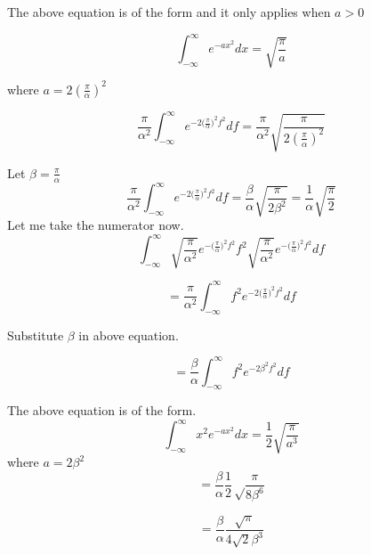 \documentclass[paper=a4, fontsize=11pt,twoside]{scrartcl}		%
\begin{document}
The above equation is of the form and it only applies when $a > 0$

\begin{equation*}
\int_{-\infty}^{\infty}e^{-ax^2 }dx = \sqrt{\frac{\pi}{a}}
\end{equation*}

where $a = 2(\frac{\pi}{\alpha})^ 2$

\begin{equation*}
\frac{\pi}{\alpha ^2} \int_{-\infty}^{\infty}{ e^{-2{(\frac{\pi} {\alpha}})^2 f^2}df} = \frac{\pi}{\alpha ^2} \sqrt{\frac{\pi}{2(\frac{\pi}{\alpha})^ 2}}
\end{equation*}

Let $\beta = \frac{\pi}{\alpha}$
\begin{equation*}
\frac{\pi}{\alpha ^2} \int_{-\infty}^{\infty}{ e^{-2{(\frac{\pi} {\alpha}})^2 f^2}df} = \frac{\beta}{\alpha} \sqrt{\frac{\pi}{2 \beta^ 2}} = \frac{1}{\alpha} \sqrt{\frac{\pi}{2 }}
\end{equation*}
Let me take the numerator now.
\begin{equation*}
\int_{-\infty}^{\infty}{\sqrt{\frac{\pi}{\alpha ^2}} e^{-{(\frac{\pi} {\alpha}})^2 f^2} f^2  \sqrt{\frac{\pi}{\alpha ^2}} e^{-{(\frac{\pi} {\alpha}})^2 f^2} df}
\end{equation*}

\begin{equation*}
=\frac{\pi}{\alpha ^2}\int_{-\infty}^{\infty}{ f^2 e^{-2{(\frac{\pi} {\alpha}})^2 f^2}  df}
\end{equation*}

Substitute $\beta$ in above equation.

\begin{equation*}
=\frac{\beta}{\alpha }\int_{-\infty}^{\infty}{ f^2 e^{-2 \beta ^2 f^2}  df}
\end{equation*}


The above equation is of the form.
\begin{equation*}
\int_{-\infty}^{\infty}x^2 e^{- ax^2 }dx = \frac{1}{2}\sqrt{\frac{\pi}{a^3}}
\end{equation*}
where $a = 2\beta ^ 2$
\begin{equation*}
 = \frac{\beta}{\alpha}\frac{1}{2}\sqrt\frac{\pi}{8\beta ^6 }
\end{equation*}

\begin{equation*}
 = \frac{\beta}{\alpha }\frac{\sqrt{\pi}}{4 \sqrt{2}\beta ^3}
\end{equation*}
\end{document}
